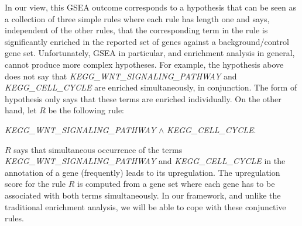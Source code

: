 \documentclass{bmcart}
\begin{document}
In our view, this GSEA outcome corresponds to a hypothesis that can be seen as a collection of three simple rules where each rule has length one and says, independent of the other rules, that the corresponding term in the rule is significantly enriched in the reported set of genes against a background/control gene set. Unfortunately, GSEA in particular, and enrichment analysis in general, cannot produce more complex hypotheses. For example, the hypothesis above does not say that \emph{KEGG\_WNT\_SIGNALING\_PATHWAY} and \emph{KEGG\_CELL\_CYCLE} are enriched simultaneously, in conjunction. The form of hypothesis only says that these terms are enriched individually.
On the other hand, let $R$ be the following rule:
\begin{center}
\emph{KEGG\_WNT\_SIGNALING\_PATHWAY} $\wedge$ \emph{KEGG\_CELL\_CYCLE}.    
\end{center}
$R$ says that simultaneous occurrence of the terms  \emph{KEGG\_WNT\_SIGNALING\_PATHWAY} and \emph{KEGG\_CELL\_CYCLE} in the annotation of a gene (frequently) leads to its upregulation. The upregulation score for the rule $R$ is computed from a gene set where each gene has to be associated with both terms simultaneously. In our framework, and unlike the traditional enrichment analysis, we will be able to cope with these conjunctive rules.
\end{document}
